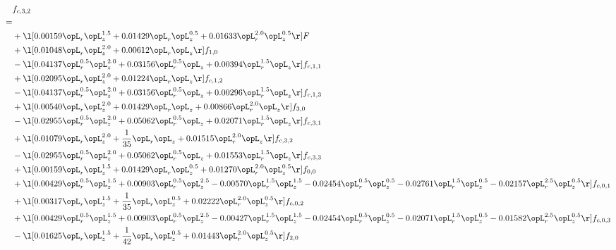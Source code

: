 \begin{alignat}{2} 
\label{eq:f_32_1} 
& f_{c,3,2} \nonumber \\ 
 = \\ 
& + \l[  0.00159 \opL_r \opL_z^{1.5} +  0.01429 \opL_r \opL_z^{0.5} +  0.01633 \opL_r^{2.0} \opL_z^{0.5}  \r] F \nonumber \\ 
& + \l[  0.01048 \opL_r \opL_z^{2.0} +  0.00612 \opL_r \opL_z  \r] f_{1,0} \nonumber \\ 
& - \l[  0.04137 \opL_r^{0.5} \opL_z^{2.0} +  0.03156 \opL_r^{0.5} \opL_z +  0.00394 \opL_r^{1.5} \opL_z  \r] f_{c,1,1} \nonumber \\ 
& + \l[  0.02095 \opL_r \opL_z^{2.0} +  0.01224 \opL_r \opL_z  \r] f_{c,1,2} \nonumber \\ 
& - \l[  0.04137 \opL_r^{0.5} \opL_z^{2.0} +  0.03156 \opL_r^{0.5} \opL_z +  0.00296 \opL_r^{1.5} \opL_z  \r] f_{c,1,3} \nonumber \\ 
& + \l[  0.00540 \opL_r \opL_z^{2.0} +  0.01429 \opL_r \opL_z +  0.00866 \opL_r^{2.0} \opL_z  \r] f_{3,0} \nonumber \\ 
& - \l[  0.02955 \opL_r^{0.5} \opL_z^{2.0} +  0.05062 \opL_r^{0.5} \opL_z +  0.02071 \opL_r^{1.5} \opL_z  \r] f_{c,3,1} \nonumber \\ 
& + \l[  0.01079 \opL_r \opL_z^{2.0} + \frac{1}{35} \opL_r \opL_z +  0.01515 \opL_r^{2.0} \opL_z  \r] f_{c,3,2} \nonumber \\ 
& - \l[  0.02955 \opL_r^{0.5} \opL_z^{2.0} +  0.05062 \opL_r^{0.5} \opL_z +  0.01553 \opL_r^{1.5} \opL_z  \r] f_{c,3,3} \nonumber \\ 
& + \l[  0.00159 \opL_r \opL_z^{1.5} +  0.01429 \opL_r \opL_z^{0.5} +  0.01270 \opL_r^{2.0} \opL_z^{0.5}  \r] f_{0,0} \nonumber \\ 
& + \l[  0.00429 \opL_r^{0.5} \opL_z^{1.5} +  0.00903 \opL_r^{0.5} \opL_z^{2.5}   -0.00570 \opL_r^{1.5} \opL_z^{1.5}   -0.02454 \opL_r^{0.5} \opL_z^{0.5}   -0.02761 \opL_r^{1.5} \opL_z^{0.5}   -0.02157 \opL_r^{2.5} \opL_z^{0.5}  \r] f_{c,0,1} \nonumber \\ 
& + \l[  0.00317 \opL_r \opL_z^{1.5} + \frac{1}{35} \opL_r \opL_z^{0.5} +  0.02222 \opL_r^{2.0} \opL_z^{0.5}  \r] f_{c,0,2} \nonumber \\ 
& + \l[  0.00429 \opL_r^{0.5} \opL_z^{1.5} +  0.00903 \opL_r^{0.5} \opL_z^{2.5}   -0.00427 \opL_r^{1.5} \opL_z^{1.5}   -0.02454 \opL_r^{0.5} \opL_z^{0.5}   -0.02071 \opL_r^{1.5} \opL_z^{0.5}   -0.01582 \opL_r^{2.5} \opL_z^{0.5}  \r] f_{c,0,3} \nonumber \\ 
& - \l[  0.01625 \opL_r \opL_z^{1.5} + \frac{1}{42} \opL_r \opL_z^{0.5} +  0.01443 \opL_r^{2.0} \opL_z^{0.5}  \r] f_{2,0} \nonumber \\ 

\end{alignat}
